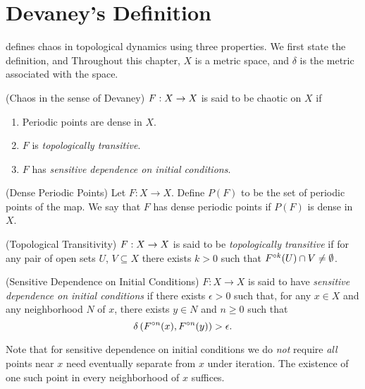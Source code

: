 \documentclass[12pt,draft,twoside]{book}
\begin{document}
\chapter{Devaney's Definition}
\label{chap:devaney}
\citet{devaney} defines chaos in topological dynamics using three properties.
We first state the definition, and 
Throughout this chapter, $X$ is a metric space, and $\delta$ is the metric associated with the space.
\begin{definition}
  (Chaos in the sense of Devaney) 
  $F: X\rightarrow X$ is said to be chaotic on $X$ if
  \begin{enumerate}
    \item Periodic points are dense in $X$.
    \item $F$ is \textit{topologically transitive}.
    \item $F$ has \textit{sensitive dependence on initial conditions}.
  \end{enumerate}
\end{definition}
%
\begin{definition}
  (Dense Periodic Points) 
  Let $F: X \to X$.
  Define $P(F)$ to be the set of periodic points of the map.
  We say that $F$ has dense periodic points if $P(F)$ is dense in $X$.
\end{definition}
%
\begin{definition}
  (Topological Transitivity) 
  $F: X \rightarrow X$ is said to be \textit{topologically transitive} if for any pair of open sets $U$, $V \subseteq X$ there exists $k > 0$ such that $F^{\circ k}(U) \cap V \neq \emptyset$.
  \label{defn:transitivity}
\end{definition}
%
\begin{definition}
  (Sensitive Dependence on Initial Conditions) 
  $F: X \rightarrow X$ is said to have \textit{sensitive dependence on initial conditions} if there exists $\epsilon > 0$ such that, for any $x \in X$ and any neighborhood $N$ of $x$, there exists $y\in N$ and $n\geq 0$ such that 
  \begin{equation*}
    \delta\left( F^{\circ n}(x), F^{\circ n}(y) \right) > \epsilon.
  \end{equation*}
  \label{defn:sdic}
\end{definition}
%
\noindent Note that for sensitive dependence on initial conditions we do \textit{not} require \textit{all} points near $x$ need eventually separate from $x$ under iteration.
The existence of one such point in every neighborhood of $x$ suffices.
\end{document}
